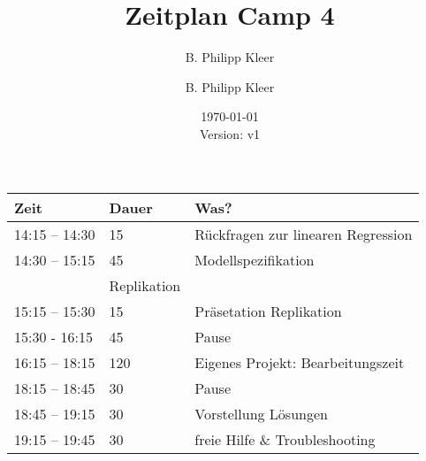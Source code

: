 \documentclass[11pt,a4paper]{article}
\author{B. Philipp Kleer}
\title{%
  Zeitplan Camp 4 \\
  }
\author{B. Philipp Kleer}
\date{\today \\ \small{Version: v1}}
\begin{document}
\maketitle

\center
\begin{longtable}{p{} p{} p{}}
	\toprule[2pt]
	\textbf{Zeit} & \textbf{Dauer} & \textbf{Was?}\\
	\midrule
	14:15 – 14:30 & 15 & Rückfragen zur linearen Regression\\
	\midrule
	14:30 – 15:15 & 45 & Modellspezifikation \\& Replikation\\
	\midrule
	15:15 – 15:30 & 15 & Präsetation Replikation\\
	\midrule[2pt]
	15:30 - 16:15 & 45 & Pause \\
	\midrule[2pt]
	16:15 – 18:15 & 120 & Eigenes Projekt: Bearbeitungszeit\\
	\midrule[2pt]
	18:15 – 18:45 & 30 & Pause\\
	\midrule[2pt]
	18:45 – 19:15 & 30 & Vorstellung Lösungen\\
	\midrule
	19:15 – 19:45 & 30 & freie Hilfe \& Troubleshooting\\	
	\bottomrule[2pt]
\end{longtable}
\end{document}
